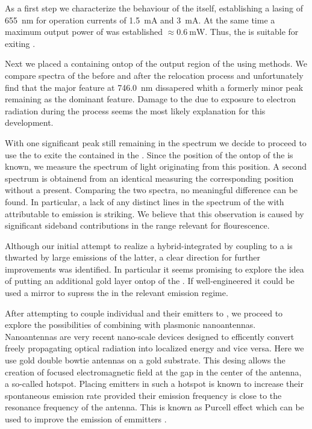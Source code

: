   As a first step we characterize the behaviour of the \VCSEL itself, establishing a lasing \wl of \SI{655}{\nm} for operation currents of \SI{1.5}{\mA} and \SI{3}{\mA}. At the same time a maximum output power of was established $\approx \SI{0.6}{\mW}$. Thus, the \VCSEL  is suitable for exiting \sivs.

   Next we placed a \nd containing \sivs ontop of the output region of the \VCSEL using \pp methods. We compare spectra of the \nd before and after the relocation process and unfortunately find that the major \zpl feature at \SI{746.0}{nm} dissapered whith a formerly minor peak remaining as the dominant feature. Damage to the \cc due to exposure to electron radiation during the \pp process seems the most likely explanation for this development.

   With one significant peak still remaining in the spectrum we decide to proceed to use the \Vcsel to exite the \sivs contained in the \nd.
   Since the position of the \nd ontop of the \VCSEL is known, we measure the spectrum of light originating from this position. A second spectrum is obtainend from an identical \VCSEL measuring the corresponding position without a \nd present. Comparing the two spectra, no meaningful difference can be found. In particular, a lack of any distinct lines in the spectrum of the \VCSEL  with \nd attributable to \siv emission is striking. We believe that this observation is caused by significant \VCSEL sideband contributions in the \wl range relevant for \siv flourescence.

   Although our initial attempt to realize a hybrid-integrated \sps by coupling \sivs to a \VCSEL is thwarted by large \sb emissions of the latter, a clear direction for further improvements was identified. In particular it seems promising to explore the idea of putting an additional gold layer ontop of the \VCSEL. If well-engineered it could be used a mirror to supress the \VCSEL \sb in the relevant \siv emission regime.


   After attempting to couple individual \nds and their emitters to \VCSELs, we proceed to explore the possibilities of combining \sivs with plasmonic nanoantennas. Nanoantennas are very recent nano-scale devices designed to efficently convert freely propagating optical radiation into localized energy and vice versa. Here we use gold double bowtie antennas on a gold substrate. This desing allows the creation of focused electromagnetic field at the gap in the center of the antenna, a so-called hotspot. Placing emitters in such a hotspot is known to increase their spontaneous emission rate provided their emission frequency is close to the resonance frequency of the antenna. This is known as Purcell effect which can be used to improve the emission of emmitters \cite{nancy::86}.

